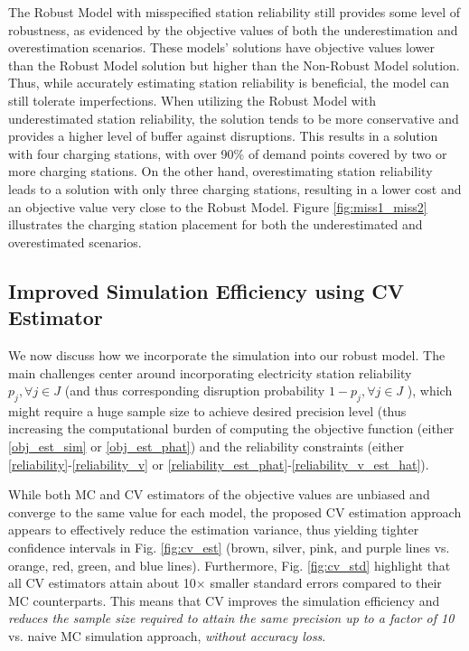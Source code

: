 \documentclass[preprint]{oscmjournal}
\theoremstyle{remark}
\begin{document}
The Robust Model with misspecified station reliability still provides some level of robustness, as evidenced by the objective values of both the underestimation and overestimation scenarios. These models' solutions have objective values lower than the Robust Model solution but higher than the Non-Robust Model solution. Thus, while accurately estimating station reliability is beneficial, the model can still tolerate imperfections. When utilizing the Robust Model with underestimated station reliability, the solution tends to be more conservative and provides a higher level of buffer against disruptions. This results in a solution with four charging stations, with over 90\% of demand points covered by two or more charging stations. On the other hand, overestimating station reliability leads to a solution with only three charging stations, resulting in a lower cost and an objective value very close to the Robust Model. Figure \ref{fig:miss1_miss2} illustrates the charging station placement for both the underestimated and overestimated scenarios.

\subsection{Improved Simulation Efficiency using CV Estimator}

We now discuss how we incorporate the simulation into our robust model. The main challenges center around incorporating electricity station reliability $p_j, \forall j \in J$ (and thus corresponding disruption probability $1-p_j, \forall j \in J$ ), which might require a huge sample size to achieve desired precision level (thus increasing the computational burden of computing the objective function (either \eqref{obj_est_sim} or \eqref{obj_est_phat}) and the reliability constraints (either \eqref{reliability}-\eqref{reliability_v} or \eqref{reliability_est_phat}-\eqref{reliability_v_est_hat}). 

While both MC and CV estimators of the objective values are unbiased and converge to the same value for each model, the proposed CV estimation approach appears to effectively reduce the estimation variance, thus yielding tighter confidence intervals in Fig. \ref{fig:cv_est} (brown, silver, pink, and purple lines vs. orange, red, green, and blue lines). Furthermore, Fig. \ref{fig:cv_std} highlight that all CV estimators attain about 10$\times$ smaller standard errors compared to their MC counterparts. This means that CV improves the simulation efficiency and \textit{reduces the sample size required to attain the same precision up to a factor of 10} vs. naive MC simulation approach, \textit{without accuracy loss}. 
\end{document}
